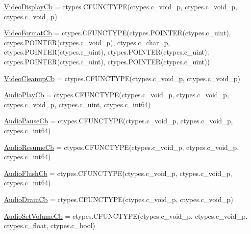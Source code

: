\begin{DoxyCompactItemize}
\item 
\hyperlink{classvlc_1_1_callback_decorators_acf6ebafc47219f7e1e13763d43130d9e}{Video\+Display\+Cb} = ctypes.\+C\+F\+U\+N\+C\+T\+Y\+PE(ctypes.\+c\+\_\+void\+\_\+p, ctypes.\+c\+\_\+void\+\_\+p, ctypes.\+c\+\_\+void\+\_\+p)
\item 
\hyperlink{classvlc_1_1_callback_decorators_aa600a700789357e1cdebe7594e3b4050}{Video\+Format\+Cb} = ctypes.\+C\+F\+U\+N\+C\+T\+Y\+PE(ctypes.\+P\+O\+I\+N\+T\+ER(ctypes.\+c\+\_\+uint), ctypes.\+P\+O\+I\+N\+T\+ER(ctypes.\+c\+\_\+void\+\_\+p), ctypes.\+c\+\_\+char\+\_\+p, ctypes.\+P\+O\+I\+N\+T\+ER(ctypes.\+c\+\_\+uint), ctypes.\+P\+O\+I\+N\+T\+ER(ctypes.\+c\+\_\+uint), ctypes.\+P\+O\+I\+N\+T\+ER(ctypes.\+c\+\_\+uint), ctypes.\+P\+O\+I\+N\+T\+ER(ctypes.\+c\+\_\+uint))
\item 
\hyperlink{classvlc_1_1_callback_decorators_ab889c16bef3f31e1347a29fbf8e162df}{Video\+Cleanup\+Cb} = ctypes.\+C\+F\+U\+N\+C\+T\+Y\+PE(ctypes.\+c\+\_\+void\+\_\+p, ctypes.\+c\+\_\+void\+\_\+p)
\item 
\hyperlink{classvlc_1_1_callback_decorators_a7885cd27fa447fe0c753fc3bb2f6f245}{Audio\+Play\+Cb} = ctypes.\+C\+F\+U\+N\+C\+T\+Y\+PE(ctypes.\+c\+\_\+void\+\_\+p, ctypes.\+c\+\_\+void\+\_\+p, ctypes.\+c\+\_\+void\+\_\+p, ctypes.\+c\+\_\+uint, ctypes.\+c\+\_\+int64)
\item 
\hyperlink{classvlc_1_1_callback_decorators_a8ea3c7d34eed9f84deb21b12fb5ec892}{Audio\+Pause\+Cb} = ctypes.\+C\+F\+U\+N\+C\+T\+Y\+PE(ctypes.\+c\+\_\+void\+\_\+p, ctypes.\+c\+\_\+void\+\_\+p, ctypes.\+c\+\_\+int64)
\item 
\hyperlink{classvlc_1_1_callback_decorators_a3720a3aa428cca4dc27fa5e474ce5da7}{Audio\+Resume\+Cb} = ctypes.\+C\+F\+U\+N\+C\+T\+Y\+PE(ctypes.\+c\+\_\+void\+\_\+p, ctypes.\+c\+\_\+void\+\_\+p, ctypes.\+c\+\_\+int64)
\item 
\hyperlink{classvlc_1_1_callback_decorators_a2201fbc863f1d02f51227e3478b69ae7}{Audio\+Flush\+Cb} = ctypes.\+C\+F\+U\+N\+C\+T\+Y\+PE(ctypes.\+c\+\_\+void\+\_\+p, ctypes.\+c\+\_\+void\+\_\+p, ctypes.\+c\+\_\+int64)
\item 
\hyperlink{classvlc_1_1_callback_decorators_a65127efbdada57ccc961fb642fd7907c}{Audio\+Drain\+Cb} = ctypes.\+C\+F\+U\+N\+C\+T\+Y\+PE(ctypes.\+c\+\_\+void\+\_\+p, ctypes.\+c\+\_\+void\+\_\+p)
\item 
\hyperlink{classvlc_1_1_callback_decorators_ab3d6a79708e355e844c1c9465fcfacd9}{Audio\+Set\+Volume\+Cb} = ctypes.\+C\+F\+U\+N\+C\+T\+Y\+PE(ctypes.\+c\+\_\+void\+\_\+p, ctypes.\+c\+\_\+void\+\_\+p, ctypes.\+c\+\_\+float, ctypes.\+c\+\_\+bool)

\end{DoxyCompactItemize}
